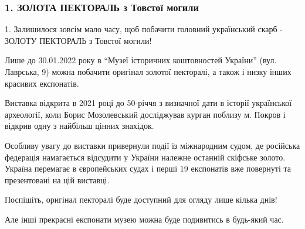  
 
 
 
 
\subsubsection{1. ЗОЛОТА ПЕКТОРАЛЬ з Товстої могили}

1. Залишилося зовсім мало часу, щоб побачити головний український скарб -
ЗОЛОТУ ПЕКТОРАЛЬ з Товстої могили!

Лише до 30.01.2022 року в \enquote{Музеї історичних коштовностей України}
(вул. Лаврська, 9) можна побачити оригінал золотої пекторалі, а також і низку
інших красивих експонатів. 


Виставка відкрита в 2021 році до 50-річчя з визначної дати в історії
української археології, коли Борис Мозолевський досліджував курган поблизу
м. Покров і відкрив одну з найбільш цінних знахідок.

Особливу увагу до виставки привернули події із міжнародним судом, де російська
федерація намагається відсудити у України належне останній скіфське золото.
Україна перемагає в європейських судах і перші 19 експонатів вже повернуті та
презентовані на цій виставці.

Поспішіть, оригінал пекторалі буде доступний для огляду лише кілька днів! 

Але інші прекрасні експонати музею можна буде подивитись в будь-який час.

